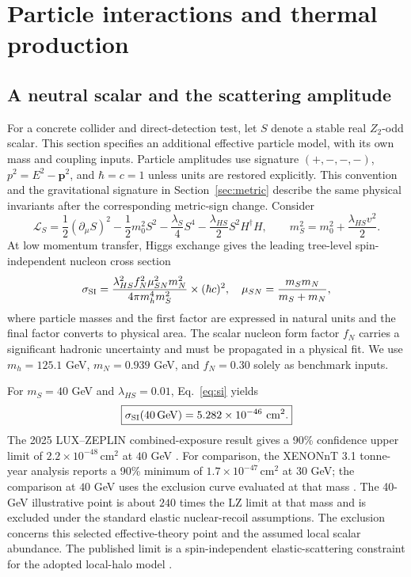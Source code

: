\section{Particle interactions and thermal production}\label{sec:thermal}

\subsection{A neutral scalar and the scattering amplitude}\label{sec:scalar-scattering}
For a concrete collider and direct-detection test, let $S$ denote a stable real $Z_2$-odd scalar. This section specifies an additional effective particle model, with its own mass and coupling inputs. Particle amplitudes use signature $(+,-,-,-)$, $p^2=E^2-\mathbf p^2$, and $\hbar=c=1$ unless units are restored explicitly. This convention and the gravitational signature in Section~\ref{sec:metric} describe the same physical invariants after the corresponding metric-sign change. Consider
\begin{equation}
\mathcal L_S=\frac12(\partial_\mu S)^2-\frac12m_0^2S^2-\frac{\lambda_S}{4}S^4
-\frac{\lambda_{HS}}2S^2H^\dagger H,\qquad
m_S^2=m_0^2+\frac{\lambda_{HS}v^2}{2}.
\end{equation}
At low momentum transfer, Higgs exchange gives the leading tree-level spin-independent nucleon cross section
\begin{equation}\label{eq:si}
\sigma_{\rm SI}=\frac{\lambda_{HS}^2f_N^2\mu_{SN}^2m_N^2}{4\pi m_h^4m_S^2}
\times(\hbar c)^2,
\quad \mu_{SN}=\frac{m_Sm_N}{m_S+m_N},
\end{equation}
where particle masses and the first factor are expressed in natural units and the final factor converts to physical area. The scalar nucleon form factor $f_N$ carries a significant hadronic uncertainty and must be propagated in a physical fit. We use $m_h=125.1$ GeV, $m_N=0.939$ GeV, and $f_N=0.30$ solely as benchmark inputs.

For $m_S=40$ GeV and $\lambda_{HS}=0.01$, Eq.~\eqref{eq:si} yields
\begin{equation}
\boxed{\sigma_{\rm SI}(40\,\mathrm{GeV})=5.282\times10^{-46}\ \mathrm{cm}^2.}
\end{equation}
The 2025 LUX--ZEPLIN combined-exposure result gives a 90\% confidence upper limit of $2.2\times10^{-48}\,\mathrm{cm}^2$ at $40$ GeV \cite{LZ25}. For comparison, the XENONnT 3.1 tonne-year analysis reports a 90\% minimum of $1.7\times10^{-47}\,\mathrm{cm}^2$ at $30$ GeV; the comparison at $40$ GeV uses the exclusion curve evaluated at that mass \cite{XENON25}. The 40-GeV illustrative point is about $240$ times the LZ limit at that mass and is excluded under the standard elastic nuclear-recoil assumptions. The exclusion concerns this selected effective-theory point and the assumed local scalar abundance. The published limit is a spin-independent elastic-scattering constraint for the adopted local-halo model \cite{LZ25}.

